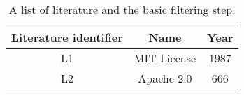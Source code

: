 
\begin{table}[h]
	\begin{center}
		\begin{tabular}{c | c | c} 
			\hline
			Literature identifier & Name & Year\\
			\hline
			L1 & MIT License & 1987 \\
			L2 & Apache 2.0 & 666 \\
		\end{tabular}
		\caption{A list of literature and the basic filtering step.}
		\label{table:appendix:a}
	\end{center}
\end{table}